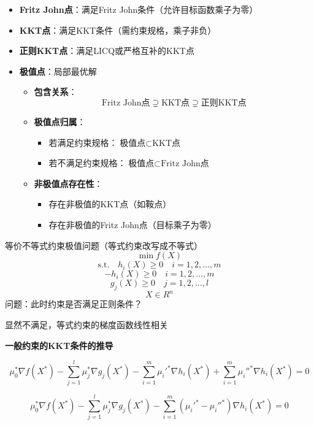 \documentclass[12pt, a4paper, oneside, UTF8]{ctexbook}
\begin{document}
\begin{itemize}
    \item \textbf{Fritz John点}：满足Fritz John条件（允许目标函数乘子为零）
    \item \textbf{KKT点}：满足KKT条件（需约束规格，乘子非负）
    \item \textbf{正则KKT点}：满足LICQ或严格互补的KKT点
    \item \textbf{极值点}：局部最优解
    
    \vspace{1em}
    \begin{itemize}
        \item \textbf{包含关系}：
        \[
        \text{Fritz John点} \supsetneq \text{KKT点} \supsetneq \text{正则KKT点}
        \]
        \item \textbf{极值点归属}：
        \begin{itemize}
            \item 若满足约束规格：$\text{极值点} \subset \text{KKT点}$
            \item 若不满足约束规格：$\text{极值点} \subset \text{Fritz John点}$
        \end{itemize}
        \item \textbf{非极值点存在性}：
        \begin{itemize}
            \item 存在非极值的KKT点（如鞍点）
            \item 存在非极值的Fritz John点（目标乘子为零）
        \end{itemize}
    \end{itemize}
\end{itemize}

等价不等式约束极值问题（等式约束改写成不等式）
\[
\min f(X)
\]
\[
\text{s.t.} \quad h_i(X) \geq 0 \quad i = 1, 2, \ldots, m
\]
\[
-h_i(X) \geq 0 \quad i = 1, 2, \ldots, m
\]
\[
g_j(X) \geq 0 \quad j = 1, 2, \ldots, l
\]
\[
X \in R^n
\]
问题：此时约束是否满足正则条件？

显然不满足，等式约束的梯度函数线性相关

\textbf{一般约束的KKT条件的推导}

\begin{equation*}
    \mu_0^* \nabla f(X^*) - \sum_{j=1}^l \mu_j^* \nabla g_j(X^*) - \sum_{i=1}^m \mu_i'^* \nabla h_i(X^*) + \sum_{i=1}^m \mu_i''^* \nabla h_i(X^*) = 0
    \end{equation*}
    
    \begin{equation*}
    \mu_0^* \nabla f(X^*) - \sum_{j=1}^l \mu_j^* \nabla g_j(X^*) - \sum_{i=1}^m (\mu_i'^* - \mu_i''^*) \nabla h_i(X^*) = 0
    \end{equation*}
    
\end{document}
